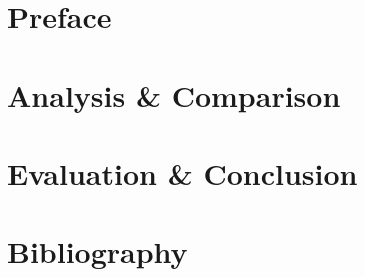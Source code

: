 \documentclass[openright,
               titlepage,
               numbers=noenddot,
               headinclude,
               footinclude=true,
               cleardoublepage=empty,
               abstractoff,
               BCOR=5mm,
               paper=a4,
               fontsize=11pt,
              ]{scrreprt}
\begin{document}
  \frenchspacing
  \raggedbottom


  \pagestyle{plain}

  

  

  \cleardoublepage
  

  \cleardoublepage
  

  \pagestyle{scrheadings}

  \cleardoublepage
  

  \cleardoublepage

  \part{Preface}

  \cleardoublepage
  
  \cleardoublepage
  
  \cleardoublepage
  
  \cleardoublepage
  

  \cleardoublepage
  \part{Analysis \& Comparison}

  \cleardoublepage
  
  \cleardoublepage
  

  \cleardoublepage
  \part{Evaluation \& Conclusion}

  \cleardoublepage
  
  \cleardoublepage
  

  \appendix
  \cleardoublepage
  \part{Bibliography}

  \cleardoublepage
  
\end{document}
